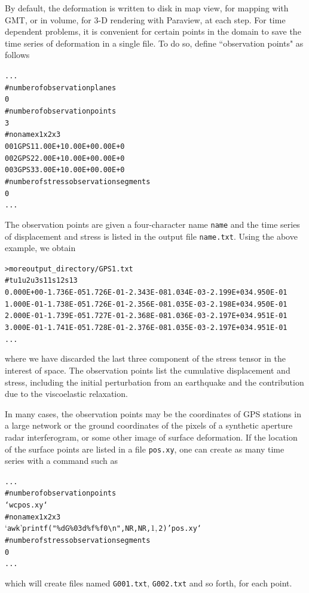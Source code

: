 \documentclass[10pt]{article}
\begin{document}
By default, the deformation is written to disk in map view, for mapping with GMT, or in volume, for 3-D rendering with Paraview, at each step. For time dependent problems, it is convenient for certain points in the domain to save the time series of deformation in a single file. To do so, define ``observation points" as follows
\begin{alltt}
...
# number of observation planes
0
# number of observation points
{\color{NavyBlue}3}
# no name       x1       x2       x3
{\color{NavyBlue} 001 GPS1  1.00E+1  0.00E+0  0.00E+0
 002 GPS2  2.00E+1  0.00E+0  0.00E+0
 003 GPS3  3.00E+1  0.00E+0  0.00E+0}
# number of stress observation segments
0
...
\end{alltt}
The observation points are given a four-character name \verb'name' and the time series of displacement and stress is listed in the output file \verb'name.txt'. Using the above example, we obtain
\begin{alltt}
> more output_directory/GPS1.txt
#         t         u1         u2         u3        s11        s12        s13
  0.000E+00 -1.736E-05  1.726E-01 -2.343E-08  1.034E-03 -2.199E+03  4.950E-01
  1.000E-01 -1.738E-05  1.726E-01 -2.356E-08  1.035E-03 -2.198E+03  4.950E-01
  2.000E-01 -1.739E-05  1.727E-01 -2.368E-08  1.036E-03 -2.197E+03  4.951E-01
  3.000E-01 -1.741E-05  1.728E-01 -2.376E-08  1.035E-03 -2.197E+03  4.951E-01
...
\end{alltt}
where we have discarded the last three component of the stress tensor in the interest of space. The observation points list the cumulative displacement and stress, including the initial perturbation from an earthquake and the contribution due to the viscoelastic relaxation.


In many cases, the observation points may be the coordinates of GPS stations in a large network or the ground coordinates of the pixels of a synthetic aperture radar interferogram, or some other image of surface deformation. If the location of the surface points are listed in a file \verb'pos.xy', one can create as many time series with a command such as
\begin{alltt}
...
# number of observation points
{\color{NavyBlue}`wc pos.xy`}
# no name       x1       x2       x3
{\color{NavyBlue}`awk '{\textbraceleft}printf("\%d G\%03d \%f \%f 0{\textbackslash}n",NR,NR,$1,$2){\textbraceright}' pos.xy`}
# number of stress observation segments
0
...
\end{alltt}
which will create files named \verb'G001.txt', \verb'G002.txt' and so forth, for each point.
\end{document}
